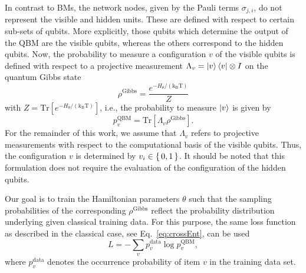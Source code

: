 \documentclass[twocolumn, aps, pra, superscriptaddress, floatfix]{revtex4}
\begin{document}
In contrast to BMs, the network nodes, given by the Pauli terms $\sigma_{j, i}$, do not represent the visible and hidden units. These are defined with respect to certain sub-sets of qubits. More explicitly, those qubits which determine the output of the QBM are the visible qubits, whereas the others correspond to the hidden qubits.
Now, the probability to measure a configuration $v$ of the visible qubits is defined with respect to a projective measurement $\Lambda_v = \ket{v}\bra{v}\otimes I$ on the quantum Gibbs state 
\begin{equation*}
\label{eq:QGibbs}
\rho^{\text{Gibbs}} = \frac{e^{-H_{\theta}/\left(\text{k}_{\text{B}}\text{T}\right)}}{Z}
\end{equation*}
with $Z=\text{Tr}\left[e^{-H_{\theta}/\left(\text{k}_{\text{B}}\text{T}\right)}\right]$, i.e., the probability to measure $\ket{v}$ is given by 
\begin{equation*}
    p_v^{\text{QBM}} = \text{Tr}\left[\Lambda_v\rho^{\text{Gibbs}} \right].
\end{equation*}
For the remainder of this work, we assume that $\Lambda_v$ refers to projective measurements with respect to the computational basis of the visible qubits. Thus, the configuration $v$ is determined by $v_i\in \set{0, 1}$. 
It should be noted that this formulation does not require the evaluation of the configuration of the hidden qubits.

Our goal is to train the Hamiltonian parameters $\theta$ such that the sampling probabilities of the corresponding $\rho^{\text{Gibbs}}$ reflect the probability distribution underlying given classical training data. For this purpose, the same loss function as described in the classical case, see Eq.~\eqref{eq:crossEnt}, can be used
\begin{equation}
\label{eq:loss_qbm}
	L = -\sum\limits_{v}p_v^{\text{data}}\log{p_v^{\text{QBM}}},
\end{equation}
where $p_v^{\text{data}}$ denotes the occurrence probability of item $v$ in the training data set.
\end{document}
